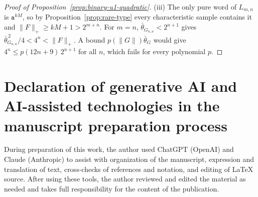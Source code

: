 \documentclass[11pt]{article}
\numberwithin{equation}{section}
\theoremstyle{plain}
\theoremstyle{definition}
\theoremstyle{remark}
\begin{document}
\begin{proof}[Proof of Proposition~\ref{prop:binary-u1-quadratic}]
(iii) The only pure word of $L_{m,n}$ is $\mathtt a^{kM}$, so by
Proposition~\ref{prop:rare-type} every characteristic sample contains it and
$\|F\|_+\ge kM+1>2^{m+n}$.  For $m=n$, $\bar\theta_{G_{n,n}}<2^{n+1}$ gives
$\bar\theta_{G_{n,n}}^{\,2}/4<4^n<\|F\|_+$.  A bound $p(\|G\|)\bar\theta_G$ would give
$4^n\le p(12n+9)\,2^{n+1}$ for all $n$, which fails for every polynomial $p$.
\end{proof}

\section*{Declaration of generative AI and AI-assisted technologies in the manuscript preparation process}
During preparation of this work, the author used ChatGPT (OpenAI) and Claude
(Anthropic) to assist with organization of the manuscript, expression and
translation of text, cross-checks of references and notation, and editing of
\LaTeX{} source. After using these tools, the author reviewed and edited the
material as needed and takes full responsibility for the content of the publication.
\end{document}
